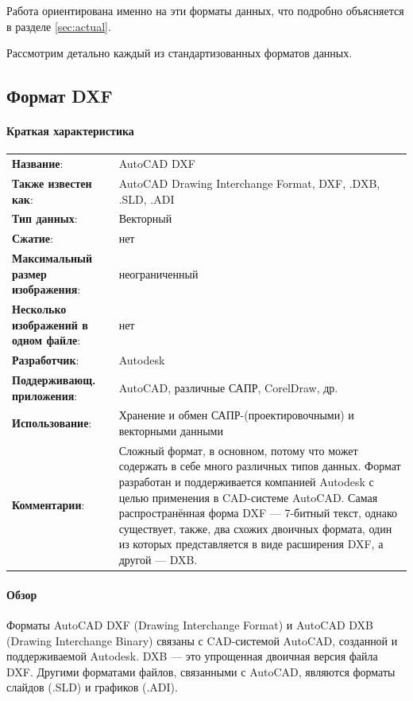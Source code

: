 Работа ориентирована именно на эти форматы данных, что подробно объясняется в разделе  \ref{sec:actual}.

Рассмотрим детально каждый из стандартизованных форматов данных.

\subsection{Формат DXF} \label{subsec:allaboutdxf}

\paragraph{Краткая характеристика}

\begin{longtable}{p{110pt} p{340pt}}
	\label{tab:dxf}
	\centering
	\textbf{Название}:&AutoCAD DXF\\
	\textbf{Также известен как}:&AutoCAD Drawing Interchange Format, DXF, .DXB, .SLD, .ADI\\
	\textbf{Тип данных}:&Векторный\\
	\textbf{Сжатие}:&нет\\
	\textbf{Максимальный размер изображения}:&неограниченный\\
	\textbf{Несколько изображений в одном файле}:&нет\\
	\textbf{Разработчик}:&Autodesk\\
	\textbf{Поддерживающ. приложения}:&AutoCAD, различные САПР, CorelDraw, др.\\
	\textbf{Использование}:&Хранение и обмен САПР-(проектировочными) и векторными данными\\
	\textbf{Комментарии}:&Сложный формат, в основном, потому что может содержать в себе много различных типов данных. Формат разработан и поддерживается компанией Autodesk с целью применения в CAD-системе AutoCAD. Самая распространённая форма DXF --- 7-битный текст, однако существует, также, два схожих двоичных формата, один из которых представляется в виде расширения DXF, а другой --- DXB.\\
\end{longtable}

\paragraph{Обзор}

Форматы AutoCAD DXF (Drawing Interchange Format) и AutoCAD DXB (Drawing Interchange Binary) связаны с CAD-системой AutoCAD, созданной и поддерживаемой Autodesk. DXB — это упрощенная двоичная версия файла DXF. Другими форматами файлов, связанными с AutoCAD, являются форматы слайдов (.SLD) и графиков (.ADI).

